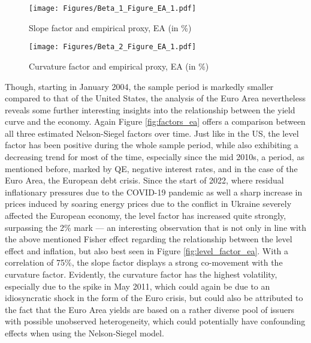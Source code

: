 \begin{figure}[!t]
    \centering
    \texttt{[image: Figures/Beta\_1\_Figure\_EA\_1.pdf]}
    \caption{Slope factor and empirical proxy, EA (in \%)}
    \label{fig:slope_factor_ea}
\end{figure}

\begin{figure}[!t]
    \centering
    \texttt{[image: Figures/Beta\_2\_Figure\_EA\_1.pdf]}
    \caption{Curvature factor and empirical proxy, EA (in \%)}
    \label{fig:curvature_factor_ea}
\end{figure}



Though, starting in January 2004, the sample period is markedly smaller compared to that of the United States, the analysis of the Euro Area nevertheless reveals some further interesting insights into the relationship between the yield curve and the economy.
Again Figure \ref{fig:factors_ea} offers a comparison between all three estimated Nelson-Siegel factors over time.
Just like in the US, the level factor has been positive during the whole sample period, while also exhibiting a decreasing trend for most of the time, especially since the mid 2010s, a period, as mentioned before, marked by QE, negative interest rates, and in the case of the Euro Area, the European debt crisis. 
Since the start of 2022, where residual inflationary pressures due to the COVID-19 pandemic as well a sharp increase in prices induced by soaring energy prices due to the conflict in Ukraine severely affected the European economy, the level factor has increased quite strongly, surpassing the 2\% mark --- an interesting observation that is not only in line with the above mentioned Fisher effect regarding the relationship between the level effect and inflation, but also best seen in Figure \ref{fig:level_factor_ea}. 
With a correlation of 75\%, the slope factor displays a strong co-movement with the curvature factor. 
Evidently, the curvature factor has the highest volatility, especially due to the spike in  May 2011, which could again be due to an idiosyncratic shock in the form of the Euro crisis, but could also be attributed  to the fact that the Euro Area yields are based on a rather diverse pool of issuers with possible unobserved heterogeneity, which could potentially have confounding effects when using the Nelson-Siegel model.

